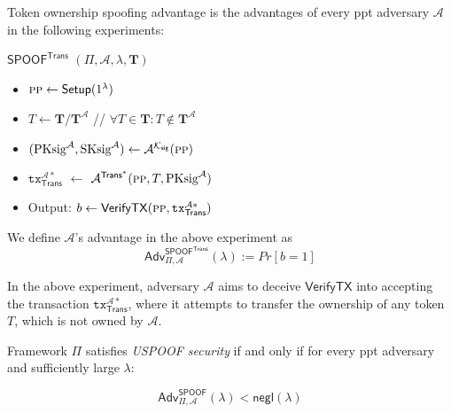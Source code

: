 \begin{definition}
            \label{def:Token ownership spoofing advantage}
            Token ownership spoofing advantage is the advantages of every \gls{ppt} adversary $\mathcal{A}$ in the following experiments:

            $\mathsf{SPOOF}^\mathsf{Trans}$  $(\Pi, \mathcal{A}, \lambda, \mathbf{T})$%
        \begin{itemize}
                \item [] $\textsc{pp} \leftarrow \textsf{Setup}(1^\lambda)$ 

                \item [] $T \leftarrow \mathbf{T}/\mathbf{T}^\mathcal{A} $  {\color{gray} // $\forall T \in \mathbf{T} : T \notin \mathbf{T}^\mathcal{A}$}
                
                \item[] $(\text{PKsig}^\mathcal{A}, \text{SKsig}^\mathcal{A}) \leftarrow \mathcal{A}^{\mathcal{K}_\mathsf{sig}}(\textsc{pp})  $ 
                
                \item[] $\texttt{tx}_\mathsf{Trans}^{\mathcal{A}\ast}$ $\leftarrow$ $\mathcal{A}^{\mathsf{Trans}^*}(\textsc{pp}, T, \text{PKsig}^\mathcal{A})$

                \item[] Output: $b \leftarrow \mathsf{VerifyTX}(\textsc{pp}, \texttt{tx}_\mathsf{Trans}^{\mathcal{A}\ast})$
        \end{itemize}
We define $\mathcal{A}$'s advantage in the above experiment as
\begin{equation}
\label{eq:Adv_SPOOF}
    \mathsf{Adv}^{\mathsf{SPOOF}^\mathsf{Trans}}_{\Pi, \mathcal{A}}(\lambda) := Pr[b=1]
\end{equation}
            \end{definition}


In the above experiment, adversary \( \mathcal{A} \) aims to deceive \( \mathsf{VerifyTX} \) into accepting the transaction \( \texttt{tx}^{\mathcal{A}*}_{\mathsf{Trans}} \), where it attempts to transfer the ownership of any token \( T \), which is not owned by \( \mathcal{A} \).



\begin{definition}
    \label{def:USPOOF}
    Framework $\Pi$ satisfies \textit{\textsf{USPOOF} security}  if and only if for every \gls{ppt} adversary and sufficiently large $\lambda$:

    \begin{equation*}
        \mathsf{Adv}^{\mathsf{SPOOF}}_{\Pi, \mathcal{A}}(\lambda) < \mathsf{negl}(\lambda)
    \end{equation*}
\end{definition}


